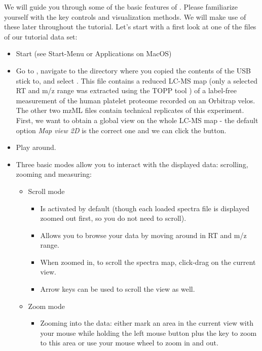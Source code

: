 We will guide you through some of the basic features of . Please familiarize yourself with the key controls and visualization methods.
We will make use of these later throughout the tutorial. Let's start with a first look at one of the files of our tutorial data set:

\begin{itemize}
\item Start  (see Start-Menu or Applications on MacOS)
\item Go to , navigate to the directory where you copied the contents of the USB stick to,
      and select
      . This file contains a reduced LC-MS map (only a selected RT and m/z range
      was extracted using the TOPP tool ) of a label-free measurement of the human platelet proteome recorded on an Orbitrap velos.
      The other two mzML files contain technical replicates of this experiment.
      First, we want to obtain a global view on the whole LC-MS map - the default option \textit{Map view 2D} is the correct one and we can click the  button. 
\item Play around.
\item Three basic modes allow you to interact with the displayed data: scrolling, zooming and measuring:
    \begin{itemize}
    \item Scroll mode
        \begin{itemize}
        \item Is activated by default (though each loaded spectra file is displayed zoomed out first, so you do not need to scroll).
        \item Allows you to browse your data by moving around in RT and m/z range.
        \item When zoomed in, to scroll the spectra map, click-drag on the current view.
        \item Arrow keys can be used to scroll the view as well.
        \end{itemize}
    \item Zoom mode
        \begin{itemize}
        \item Zooming into the data: either mark an area in the current view with your mouse while holding the left mouse
              button plus the \keys{\ctrl} key to zoom to this area
              or use your mouse wheel to zoom in and out.

\end{itemize}
\end{itemize}
\end{itemize}
